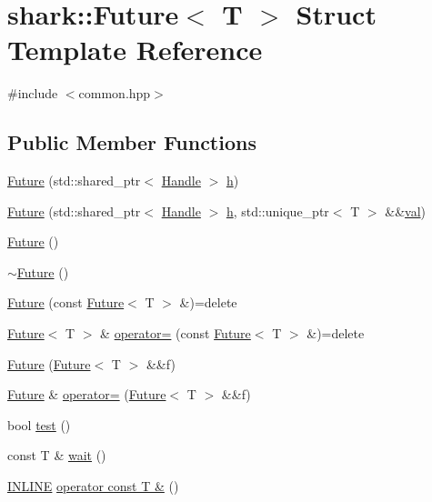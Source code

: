 \hypertarget{structshark_1_1_future}{}\section{shark\+:\+:Future$<$ T $>$ Struct Template Reference}
\label{structshark_1_1_future}


{\ttfamily \#include $<$common.\+hpp$>$}

\subsection*{Public Member Functions}
\begin{DoxyCompactItemize}
\item 
\hyperlink{structshark_1_1_future_a92d1efe967edc2466b85ac14062cde61}{Future} (std\+::shared\+\_\+ptr$<$ \hyperlink{classshark_1_1_handle}{Handle} $>$ \hyperlink{structshark_1_1_future_a54f00db085adbffb18b2e2ab9e3d4b32}{h})
\item 
\hyperlink{structshark_1_1_future_a2c240241a370e1775353f3c4f0f1b3bb}{Future} (std\+::shared\+\_\+ptr$<$ \hyperlink{classshark_1_1_handle}{Handle} $>$ \hyperlink{structshark_1_1_future_a54f00db085adbffb18b2e2ab9e3d4b32}{h}, std\+::unique\+\_\+ptr$<$ T $>$ \&\&\hyperlink{structshark_1_1_future_ad47e70b84ce6303568af0bd6aca991da}{val})
\item 
\hyperlink{structshark_1_1_future_adbc00059974d00508636b062c2062b9b}{Future} ()
\item 
\hyperlink{structshark_1_1_future_aa17ac6c907e9768b69c143d0b4046551}{$\sim$\+Future} ()
\item 
\hyperlink{structshark_1_1_future_a3c76fd022444f58fcc06ee248d81f72b}{Future} (const \hyperlink{structshark_1_1_future}{Future}$<$ T $>$ \&)=delete
\item 
\hyperlink{structshark_1_1_future}{Future}$<$ T $>$ \& \hyperlink{structshark_1_1_future_a45d4c1fdd9602d41f7e07f49b31e5943}{operator=} (const \hyperlink{structshark_1_1_future}{Future}$<$ T $>$ \&)=delete
\item 
\hyperlink{structshark_1_1_future_a6eff07d7db700729f333f86712dd5f07}{Future} (\hyperlink{structshark_1_1_future}{Future}$<$ T $>$ \&\&f)
\item 
\hyperlink{structshark_1_1_future}{Future} \& \hyperlink{structshark_1_1_future_a660602bfa8a6096020931f35f8d7a7a1}{operator=} (\hyperlink{structshark_1_1_future}{Future}$<$ T $>$ \&\&f)
\item 
bool \hyperlink{structshark_1_1_future_abbc3d1456a7c62296de4ec4603efac2a}{test} ()
\item 
const T \& \hyperlink{structshark_1_1_future_a88a411b5cedec34af07b054d15deedc2}{wait} ()
\item 
\hyperlink{common_8hpp_a2eb6f9e0395b47b8d5e3eeae4fe0c116}{I\+N\+L\+I\+NE} \hyperlink{structshark_1_1_future_a2ad40708ac7a1df9e288af5739d513f1}{operator const T \&} ()
\end{DoxyCompactItemize}
